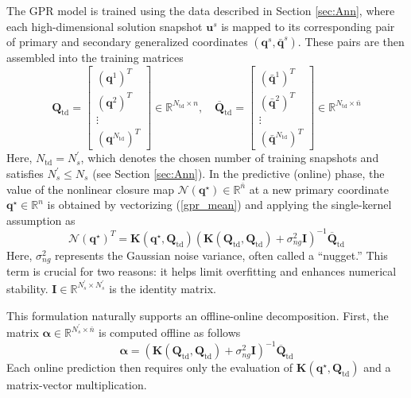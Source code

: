 \documentclass[preprint,10pt]{elsarticle}
\begin{document}
The GPR model is trained using the data described in Section \ref{sec:Ann}, where each high-dimensional solution snapshot $\mathbf{u}^s$ is mapped to its corresponding pair of 
primary and secondary generalized coordinates $(\mathbf{q}^s, \bar{\mathbf{q}}^s)$. These pairs are then assembled into the training matrices
\begin{equation*}
\mathbf{Q}_{\text{td}} = \begin{bmatrix} (\mathbf{q}^{1})^{T} \\ (\mathbf{q}^{2})^{T} \\ \vdots \\ (\mathbf{q}^{N_{\text{td}}})^{T} \end{bmatrix} \!\in
\mathbb{R}^{N_{\text{td}} \times n}, \quad \overline{\mathbf{Q}}_{\text{td}} = \begin{bmatrix} (\bar{\mathbf{q}}^{1})^{T} \\ (\bar{\mathbf{q}}^{2})^{T} \\
\vdots \\ (\bar{\mathbf{q}}^{N_{\text{td}}})^{T} \end{bmatrix} \!\in \mathbb{R}^{N_{\text{td}} \times \bar{n}}
\end{equation*}
Here, $N_{\text{td}} = N_s^\prime$, which denotes the chosen number of training snapshots and satisfies $N_s^\prime \le N_s$ 
(see Section \ref{sec:Ann}).
In the predictive (online) phase, the value of the nonlinear closure map $\mathcal{N}(\mathbf q^{\star}) \in \mathbb{R}^{\bar n}$ at a new primary coordinate 
$\mathbf q^{\star}\in\mathbb R^{n}$ is obtained by vectorizing (\ref{gpr_mean}) and applying the single-kernel assumption as
\begin{equation}
	\mathcal{N}(\mathbf{q}^\star)^T = \mathbf{K}(\mathbf{q}^\star, \mathbf{Q}_{\text{td}}) \left(\mathbf{K}(\mathbf{Q}_{\text{td}},\mathbf{Q}_{\text{td}}) + \sigma_{ng}^2
	\mathbf{I}\right)^{-1}\overline{\mathbf{Q}}_{\text{td}}
\label{gpr}
\end{equation}
Here, $\sigma_{ng}^2$ represents the Gaussian noise variance, often called a ``nugget.'' This term is crucial for two reasons: it helps limit overfitting and enhances 
numerical stability. $\mathbf{I} \in \mathbb{R}^{N_s^\prime \times N_s^\prime}$ is the identity matrix.

This formulation naturally supports an offline-online decomposition. First, the matrix $\boldsymbol{\alpha} \in \mathbb{R}^{N_s^\prime \times \bar{n}}$ is computed offline 
as follows
\begin{equation}
	\boldsymbol{\alpha} = \left(\mathbf{K}(\mathbf{Q}_{\text{td}},\mathbf{Q}_{\text{td}}) + \sigma_{ng}^2\mathbf{I}\right)^{-1} \overline{\mathbf{Q}}_{\text{td}}
\label{gpr_alpha}
\end{equation}
Each online prediction then requires only the evaluation of $\mathbf{K}(\mathbf{q}^\star, \mathbf{Q}_{\text{td}})$ and a matrix-vector multiplication.
\end{document}
